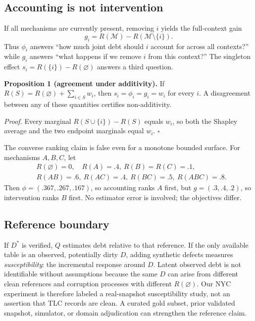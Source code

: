 \documentclass[conference]{IEEEtran}
\newcommand{\players}{\mathcal{M}}
\begin{document}
\subsection{Accounting is not intervention}

If all mechanisms are currently present, removing $i$ yields the full-context gain
\begin{equation}
 g_i=R(\players)-R(\players\setminus\{i\}).
 \label{eq:gain}
\end{equation}
Thus $\phi_i$ answers ``how much joint debt should $i$ account for across all contexts?'' while $g_i$ answers ``what happens if we remove $i$ from this context?'' The singleton effect $s_i=R(\{i\})-R(\varnothing)$ answers a third question.

\textbf{Proposition 1 (agreement under additivity).} If $R(S)=R(\varnothing)+\sum_{i\in S}w_i$, then $s_i=\phi_i=g_i=w_i$ for every $i$. A disagreement between any of these quantities certifies non-additivity.

\emph{Proof.} Every marginal $R(S\cup\{i\})-R(S)$ equals $w_i$, so both the Shapley average and the two endpoint marginals equal $w_i$. \hfill$\square$

The converse ranking claim is false even for a monotone bounded surface. For mechanisms $A,B,C$, let
\begin{align*}
&R(\varnothing)=0,\quad R(A)=.4,\ R(B)=R(C)=.1,\\
&R(AB)=.6,\ R(AC)=.4,\ R(BC)=.5,\ R(ABC)=.8.
\end{align*}
Then $\phi=(.367,.267,.167)$, so accounting ranks $A$ first, but $g=(.3,.4,.2)$, so intervention ranks $B$ first. No estimator error is involved; the objectives differ.

\subsection{Reference boundary}

If $D^*$ is verified, $Q$ estimates debt relative to that reference. If the only available table is an observed, potentially dirty $D$, adding synthetic defects measures \emph{susceptibility}: the incremental response around $D$. Latent observed debt is not identifiable without assumptions because the same $D$ can arise from different clean references and corruption processes with different $R(\varnothing)$. Our NYC experiment is therefore labeled a real-snapshot susceptibility study, not an assertion that TLC records are clean. A curated gold subset, prior validated snapshot, simulator, or domain adjudication can strengthen the reference claim.
\end{document}
